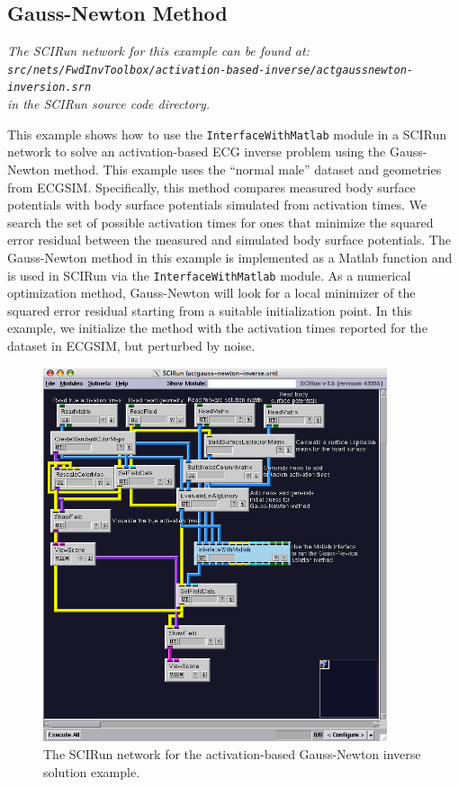 \documentclass[fleqn,11pt,openany]{book}
\begin{document}
\subsection{Gauss-Newton Method}

\vspace{5pt}\textit{The SCIRun network for this example can be found at:\\{\tt src/nets/FwdInvToolbox/activation-based-inverse/actgaussnewton-inversion.srn}\\in the SCIRun source code directory.}\vspace{5pt}

This example shows how to use the {\tt InterfaceWithMatlab} module in a SCIRun network to solve an activation-based ECG inverse problem using the Gauss-Newton method. This example uses the ``normal male'' dataset and geometries from ECGSIM. Specifically, this method compares measured body surface potentials with body surface potentials simulated from activation times. We search the set of possible activation times for ones that minimize the squared error residual between the measured and simulated body surface potentials. The Gauss-Newton method in this example is implemented as a Matlab function and is used in SCIRun via the {\tt InterfaceWithMatlab} module. As a numerical optimization method, Gauss-Newton will look for a local minimizer of the squared error residual starting from a suitable initialization point. In this example, we initialize the method with the activation times reported for the dataset in ECGSIM, but perturbed by noise.

\begin{figure}[H]
\begin{center}
\includegraphics[width=0.9\textwidth]{ECGToolkitGuide_figures/actgaussnewtonnetwork.png}
\caption{The SCIRun network for the activation-based Gauss-Newton inverse solution example.}
\label{GaussNewtonNetworkExample}
\end{center}
\end{figure}
\end{document}
